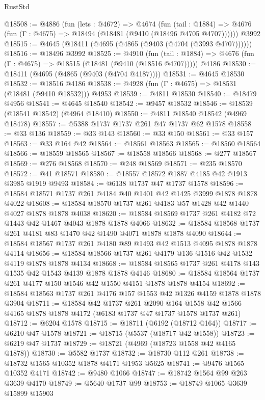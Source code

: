 \begin{lexlean}{RustStd}
\begin{coremodule}
@18508 := @4886
    (fun (lets : @4672) =>
    @4674
      (fun (tail : @1884) =>
      @4676 (fun (Γ : @4675) => @18494 (@18481 (@9410 (@18496 @4705 @4707))))))
    @3992
@18515 := @4645 (@18411 (@4695 (@4865 (@9403 (@4704 (@3993 @4707))))))
@18516 := @18496 @3992
@18525 := @4910
    (fun (tail : @1884) => @4676 (fun (Γ : @4675) => @18515 (@18481 (@9410 (@18516 @4707)))))
    @4186
@18530 := @18411 (@4695 (@4865 (@9403 (@4704 @4187))))
@18531 := @4645 @18530
@18532 := @18516 @4186
@18538 := @4928 (fun (Γ : @4675) => @18531 (@18481 (@9410 @18532))) @4953
@18539 := @4811 @18530
@18540 := @18479 @4956
@18541 := @4645 @18540
@18542 := @9457 @18532
@18546 := @18539 (@18541 @18542) (@4964 @18410)
@18550 := @4811 @18540 @18542 (@4969 @18478)
@18557 := @5388 @1737 @1737 @261 @47 @1737 @62 @1578
@18558 := @33 @136
@18559 := @33 @143
@18560 := @33 @150
@18561 := @33 @157
@18563 := @33 @164 @42
@18564 := @18561 @18563
@18565 := @18560 @18564
@18566 := @18559 @18565
@18567 := @18558 @18566
@18568 := @277 @18567
@18569 := @276 @18568
@18570 := @248 @18569
@18571 := @235 @18570
@18572 := @41 @18571
@18580 := @18557 @18572 @1887 @4185 @42 @1913 @3985 @1919 @9493
@18584 := @6138 @1737 @47 @1737 @1578
@18596 := @18584 @18571 @1737 @261 @4184 @40 @1401 @42 @1425 @3999 @1878 @1878 @4022
@18608 := @18584 @18570 @1737 @261 @4183 @57 @1428 @42 @1440 @4027 @1878 @1878 @4038
@18620 := @18584 @18569 @1737 @261 @4182 @72 @1443 @42 @1467 @4043 @1878 @1878 @4066
@18632 := @18584 @18568 @1737 @261 @4181 @83 @1470 @42 @1490 @4071 @1878 @1878 @4090
@18644 := @18584 @18567 @1737 @261 @4180 @89 @1493 @42 @1513 @4095 @1878 @1878 @4114
@18656 := @18584 @18566 @1737 @261 @4179 @136 @1516 @42 @1532 @4119 @1878 @1878 @4134
@18668 := @18584 @18565 @1737 @261 @4178 @143 @1535 @42 @1543 @4139 @1878 @1878 @4146
@18680 := @18584 @18564 @1737 @261 @4177 @150 @1546 @42 @1550 @4151 @1878 @1878 @4154
@18692 := @18584 @18563 @1737 @261 @4176 @157 @1553 @42 @1326 @4159 @1878 @1878 @3904
@18711 := @18584
    @42
    @1737
    @261
    @2090
    @164
    @1558
    @42
    @1566
    @4165
    @1878
    @1878
    @4172
    (@6183 @1737 @47 @1737 @1578 @1737 @261)
@18712 := @6204 @1578
@18715 := @18711 (@6192 (@18712 @164))
@18717 := @6210 @47 @1578
@18721 := @18715 (@5537 (@18717 @42 @1558))
@18723 := @6219 @47 @1737
@18729 := @18721 (@4969 (@18723 @1558 @42 @4165 @1878))
@18730 := @5582 @1737
@18732 := @18730 @112 @261
@18738 := @18732 @1565 @10352 @1878 @4171 @1953 @5625
@18741 := @9476 @1565 @10352 @4171
@18742 := @9480 @1066
@18747 := @18742 @1564 @99 @263 @3639 @4170
@18749 := @5640 @1737 @99
@18753 := @18749 @1065 @3639 @15899 @15903

\end{coremodule}
\end{lexlean}
